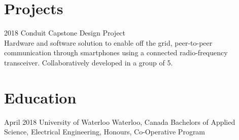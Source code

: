 \documentclass[letterpaper]{twentysecondcv} %
\begin{document}
\section{Projects}
\begin{twenty}
\twentyitem
   		{2018}
        {Conduit}
        {Capstone Design Project}
        {}
        {
        \\
        Hardware and software solution to enable off the grid, peer-to-peer communication through smartphones using a connected radio-frequency transceiver. Collaboratively developed in a group of 5. 
        }
\end{twenty}

\section{Education}
\begin{twenty}
\twentyitem
   		{April 2018}
        {University of Waterloo}
        {Waterloo, Canada}
        {}
        {
        Bachelors of Applied Science, Electrical Engineering, Honours, Co-Operative Program
        }
\end{twenty}
\end{document}
